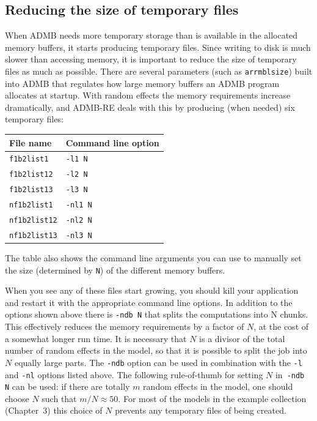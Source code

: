 \documentclass[12pt,letter,reqno]{book}
\begin{document}
\subsection{Reducing the size of temporary files}
\label{Memory_management}
When ADMB needs more temporary storage than is available in the
allocated memory buffers, it starts producing temporary files. Since writing to disk is much slower than
accessing memory, it is important to reduce the size of temporary files as much as possible. There are several
parameters (such as \texttt{arrmblsize}) built into ADMB that regulates how large memory buffers an ADMB program
allocates at startup. With random effects the memory requirements increase dramatically, and ADMB-RE deals with
this by producing (when needed) six temporary files:
\begin{center}
\begin{tabular}{ll}
\textbf{File name} & \textbf{Command line option} \\ \hline
\texttt{f1b2list1} & \texttt{-l1 N} \\
\texttt{f1b2list12} & \texttt{-l2 N} \\
\texttt{f1b2list13} & \texttt{-l3 N} \\
\texttt{nf1b2list1} & \texttt{-nl1 N} \\
\texttt{nf1b2list12} & \texttt{-nl2 N} \\
\texttt{nf1b2list13} & \texttt{-nl3 N} \\ \hline
\end{tabular}%
\end{center}
The table also shows the command line arguments you can use to manually set the size (determined by \texttt{N}) of the different
memory buffers.

When you see any of these files start growing, you should kill your application and restart
it with the appropriate command line options. In addition to the options shown above
there is \texttt{-ndb N} that splits the computations into N chunks. This effectively reduces
the memory requirements by a factor of $N$, at the cost of a somewhat longer run time.
It is necessary that $N$ is a divisor of the total number of random effects in the model,
so that it is possible to split the job into $N$ equally large parts.
The \texttt{-ndb} option can be used in combination with the \texttt{-l} and \texttt{-nl} options listed above.
The following rule-of-thumb for setting $N$ in~\texttt{-ndb N} can be used: if there are totally $m$ random effects in the model,
one should choose $N$ such that $m/N\approx 50$.
For most of the models in the example collection (Chapter~3) this choice of $N$ prevents any temporary files of being created.
\end{document}
